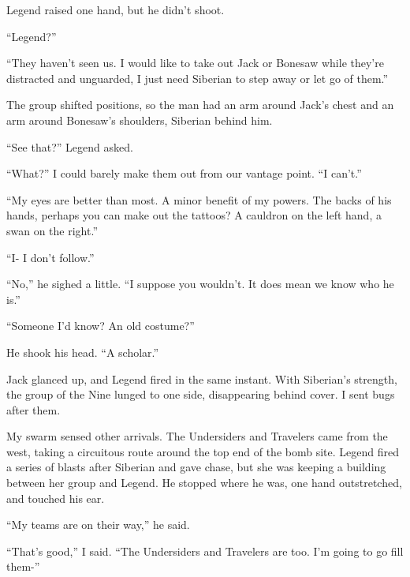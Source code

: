 Legend raised one hand, but he didn't shoot.



``Legend?''



``They haven't seen us.  I would like to take out Jack or Bonesaw while they're distracted and unguarded, I just need Siberian to step away or let go of them.''



The group shifted positions, so the man had an arm around Jack's chest and an arm around Bonesaw's shoulders, Siberian behind him.



``See that?'' Legend asked.



``What?''  I could barely make them out from our vantage point.  ``I can't.''



``My eyes are better than most.  A minor benefit of my powers.  The backs of his hands, perhaps you can make out the tattoos?  A cauldron on the left hand, a swan on the right.''



``I- I don't follow.''



``No,'' he sighed a little.  ``I suppose you wouldn't.  It does mean we know who he is.''



``Someone I'd know?  An old costume?''



He shook his head.  ``A scholar.''



Jack glanced up, and Legend fired in the same instant.  With Siberian's strength, the group  of the Nine lunged to one side, disappearing behind cover.  I sent bugs after them.



My swarm sensed other arrivals.  The Undersiders and Travelers came from the west, taking a circuitous route around the top end of the bomb site.  Legend fired a series of blasts after Siberian and gave chase, but she was keeping a building between her group and Legend.   He stopped where he was, one hand outstretched, and touched his ear.



``My teams are on their way,'' he said.



``That's good,'' I said.  ``The Undersiders and Travelers are too.  I'm going to go fill them-''



